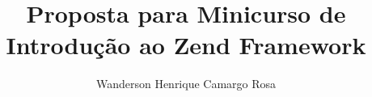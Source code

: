 \documentclass{article}
\title{Proposta para Minicurso de Introdução ao Zend Framework}
\author{Wanderson Henrique Camargo Rosa}
\begin{document}
\maketitle{}
\end{document}
